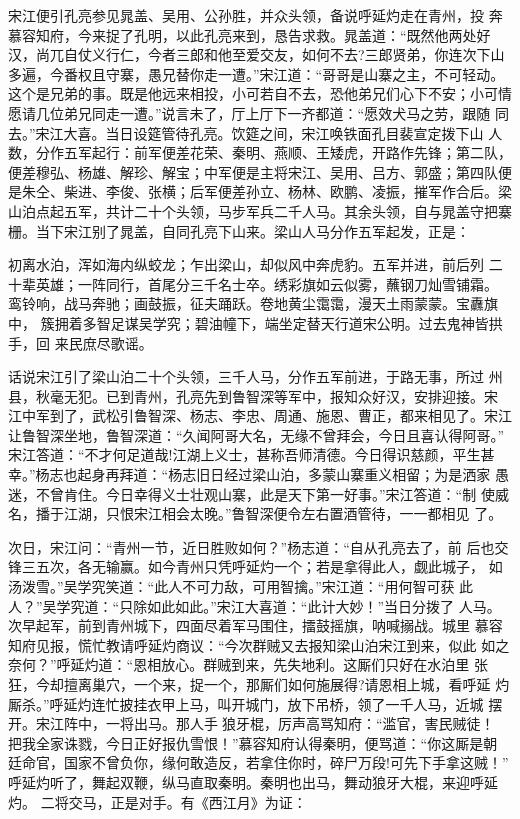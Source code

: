 宋江便引孔亮参见晁盖、吴用、公孙胜，并众头领，备说呼延灼走在青州，投
奔慕容知府，今来捉了孔明，以此孔亮来到，恳告求救。晁盖道：“既然他两处好
汉，尚兀自仗义行仁，今者三郎和他至爱交友，如何不去?三郎贤弟，你连次下山
多遍，今番权且守寨，愚兄替你走一遭。”宋江道：“哥哥是山寨之主，不可轻动。
这个是兄弟的事。既是他远来相投，小可若自不去，恐他弟兄们心下不安；小可情
愿请几位弟兄同走一遭。”说言未了，厅上厅下一齐都道：“愿效犬马之劳，跟随
同去。”宋江大喜。当日设筵管待孔亮。饮筵之间，宋江唤铁面孔目裴宣定拨下山
人数，分作五军起行：前军便差花荣、秦明、燕顺、王矮虎，开路作先锋；第二队，
便差穆弘、杨雄、解珍、解宝；中军便是主将宋江、吴用、吕方、郭盛；第四队便
是朱仝、柴进、李俊、张横；后军便差孙立、杨林、欧鹏、凌振，摧军作合后。梁
山泊点起五军，共计二十个头领，马步军兵二千人马。其余头领，自与晁盖守把寨
栅。当下宋江别了晁盖，自同孔亮下山来。梁山人马分作五军起发，正是：

初离水泊，浑如海内纵蛟龙；乍出梁山，却似风中奔虎豹。五军并进，前后列
二十辈英雄；一阵同行，首尾分三千名士卒。绣彩旗如云似雾，蘸钢刀灿雪铺霜。
鸾铃响，战马奔驰；画鼓振，征夫踊跃。卷地黄尘霭霭，漫天土雨蒙蒙。宝纛旗中，
簇拥着多智足谋吴学究；碧油幢下，端坐定替天行道宋公明。过去鬼神皆拱手，回
来民庶尽歌谣。

话说宋江引了梁山泊二十个头领，三千人马，分作五军前进，于路无事，所过
州县，秋毫无犯。已到青州，孔亮先到鲁智深等军中，报知众好汉，安排迎接。宋
江中军到了，武松引鲁智深、杨志、李忠、周通、施恩、曹正，都来相见了。宋江
让鲁智深坐地，鲁智深道：“久闻阿哥大名，无缘不曾拜会，今日且喜认得阿哥。”
宋江答道：“不才何足道哉!江湖上义士，甚称吾师清德。今日得识慈颜，平生甚
幸。”杨志也起身再拜道：“杨志旧日经过梁山泊，多蒙山寨重义相留；为是洒家
愚迷，不曾肯住。今日幸得义士壮观山寨，此是天下第一好事。”宋江答道：“制
使威名，播于江湖，只恨宋江相会太晚。”鲁智深便令左右置酒管待，一一都相见
了。

次日，宋江问：“青州一节，近日胜败如何？”杨志道：“自从孔亮去了，前
后也交锋三五次，各无输赢。如今青州只凭呼延灼一个；若是拿得此人，觑此城子，
如汤泼雪。”吴学究笑道：“此人不可力敌，可用智擒。”宋江道：“用何智可获
此人？”吴学究道：“只除如此如此。”宋江大喜道：“此计大妙！”当日分拨了
人马。次早起军，前到青州城下，四面尽着军马围住，擂鼓摇旗，呐喊搦战。城里
慕容知府见报，慌忙教请呼延灼商议：“今次群贼又去报知梁山泊宋江到来，似此
如之奈何？”呼延灼道：“恩相放心。群贼到来，先失地利。这厮们只好在水泊里
张狂，今却擅离巢穴，一个来，捉一个，那厮们如何施展得?请恩相上城，看呼延
灼厮杀。”呼延灼连忙披挂衣甲上马，叫开城门，放下吊桥，领了一千人马，近城
摆开。宋江阵中，一将出马。那人手狼牙棍，厉声高骂知府：“滥官，害民贼徒！
把我全家诛戮，今日正好报仇雪恨！”慕容知府认得秦明，便骂道：“你这厮是朝
廷命官，国家不曾负你，缘何敢造反，若拿住你时，碎尸万段!可先下手拿这贼！”
呼延灼听了，舞起双鞭，纵马直取秦明。秦明也出马，舞动狼牙大棍，来迎呼延灼。
二将交马，正是对手。有《西江月》为证：

